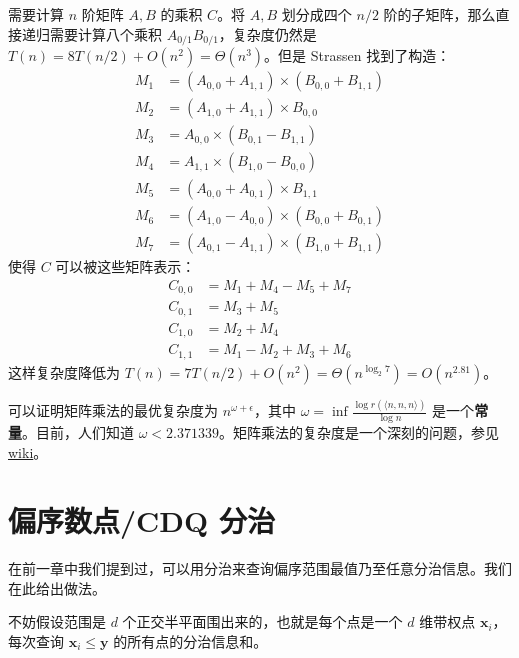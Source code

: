 \begin{example}
    需要计算 $n$ 阶矩阵 $A,B$ 的乘积 $C$。将 $A,B$ 划分成四个 $n/2$ 阶的子矩阵，那么直接递归需要计算八个乘积 $A_{0/1}B_{0/1}$，复杂度仍然是 $T(n)=8T(n/2)+O(n^2)=\Theta(n^3)$。但是 Strassen 找到了构造：
    $$
    \begin{aligned}
        M_1 &= (A_{0,0} + A_{1,1}) \times (B_{0,0} + B_{1,1}) \\
        M_2 &= (A_{1,0} + A_{1,1}) \times B_{0,0} \\
        M_3 &= A_{0,0} \times (B_{0,1} - B_{1,1}) \\
        M_4 &= A_{1,1} \times (B_{1,0} - B_{0,0}) \\
        M_5 &= (A_{0,0} + A_{0,1}) \times B_{1,1} \\
        M_6 &= (A_{1,0} - A_{0,0}) \times (B_{0,0} + B_{0,1}) \\
        M_7 &= (A_{0,1} - A_{1,1}) \times (B_{1,0} + B_{1,1})
    \end{aligned}
    $$
    使得 $C$ 可以被这些矩阵表示：
    $$
        \begin{aligned}
        C_{0,0} &= M_1 + M_4 - M_5 + M_7 \\
        C_{0,1} &= M_3 + M_5 \\
        C_{1,0} &= M_2 + M_4 \\
        C_{1,1} &= M_1 - M_2 + M_3 + M_6
        \end{aligned}
    $$
    这样复杂度降低为 $T(n)=7T(n/2)+O(n^2)=\Theta(n^{\log_2 7})=O(n^{2.81})$。
\end{example}
\begin{remark}
    可以证明矩阵乘法的最优复杂度为 $n^{\omega+\epsilon}$，其中 $\omega=\inf\frac{\log r(\langle n,n,n\rangle)}{\log n}$ 是一个\textbf{常量}。目前，人们知道 $\omega<2.371339$。矩阵乘法的复杂度是一个深刻的问题，参见 \href{https://en.wikipedia.org/wiki/Computational_complexity_of_matrix_multiplication}{wiki}。
\end{remark}

\section{偏序数点/CDQ 分治}

在前一章中我们提到过，可以用分治来查询偏序范围最值乃至任意分治信息。我们在此给出做法。

不妨假设范围是 $d$ 个正交半平面围出来的，也就是每个点是一个 $d$ 维带权点 $\mathbf x_i$，每次查询 $\mathbf x_i\le \mathbf y$ 的所有点的分治信息和。

